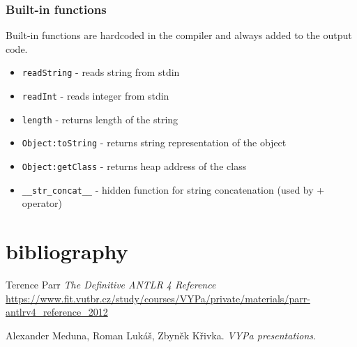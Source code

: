 \documentclass[a4paper,11pt]{article}
\begin{document}
                \subsubsection{Built-in functions}
                    Built-in functions are hardcoded in the compiler and always added to the output code.
                    \begin{itemize}
                        \item \texttt{readString} - reads string from stdin
                        \item \texttt{readInt} - reads integer from stdin
                        \item \texttt{length} - returns length of the string
                        \item \texttt{Object:toString} - returns string representation of the object
                        \item \texttt{Object:getClass} - returns heap address of the class
                        \item \texttt{\_\_str\_concat\_\_} - hidden function for string concatenation (used by + operator)
                    \end{itemize}


    \section{bibliography}
        \begin{bibliography}{}
            Terence Parr
            \textit{The Definitive ANTLR 4 Reference}
            \url{https://www.fit.vutbr.cz/study/courses/VYPa/private/materials/parr-antlrv4_reference_2012}

            Alexander Meduna, Roman Lukáš, Zbyněk Křivka.
            \textit{VYPa presentations}.
        \end{bibliography}
\end{document}
